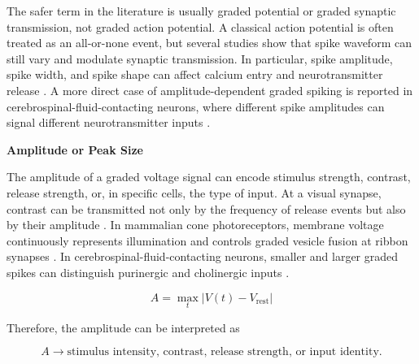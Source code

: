 \documentclass{book}
\providecommand{\ProjectDeepHeading}[2]{%
    \par\medskip\noindent\textbf{#2}\par\smallskip
}
\begin{document}
        The safer term in the literature is usually graded potential or graded synaptic transmission, not graded action potential. A classical action potential is often treated as an all-or-none event, but several studies show that spike waveform can still vary and modulate synaptic transmission. In particular, spike amplitude, spike width, and spike shape can affect calcium entry and neurotransmitter release \citep{zbili-2019-past-and-future-of-analog-digital-modulation-of-synaptic-transmission}. A more direct case of amplitude-dependent graded spiking is reported in cerebrospinal-fluid-contacting neurons, where different spike amplitudes can signal different neurotransmitter inputs \citep{johnson-2023-graded-spikes-differentially-signal-neurotransmitter-input-in-cerebrospinal-fluid-contacting-neurons-of-the-mouse-spinal-cord}.
        
        \ProjectDeepHeading{13}{Amplitude or Peak Size}
            
            The amplitude of a graded voltage signal can encode stimulus strength, contrast, release strength, or, in specific cells, the type of input. At a visual synapse, contrast can be transmitted not only by the frequency of release events but also by their amplitude \citep{james-2019-an-amplitude-code-transmits-information-at-a-visual-synapse}. In mammalian cone photoreceptors, membrane voltage continuously represents illumination and controls graded vesicle fusion at ribbon synapses \citep{grabner-2023-mechanisms-of-simultaneous-linear-and-nonlinear-computations-at-the-mammalian-cone-photoreceptor-synapse}. In cerebrospinal-fluid-contacting neurons, smaller and larger graded spikes can distinguish purinergic and cholinergic inputs \citep{johnson-2023-graded-spikes-differentially-signal-neurotransmitter-input-in-cerebrospinal-fluid-contacting-neurons-of-the-mouse-spinal-cord}.
            
            \begin{equation}
                A
                =
                \max_t |V(t)-V_{\mathrm{rest}}|
            \end{equation}
            
            Therefore, the amplitude can be interpreted as
            
            \begin{equation}
                A
                \rightarrow
                \text{stimulus intensity, contrast, release strength, or input identity}.
            \end{equation}
        
\end{document}
